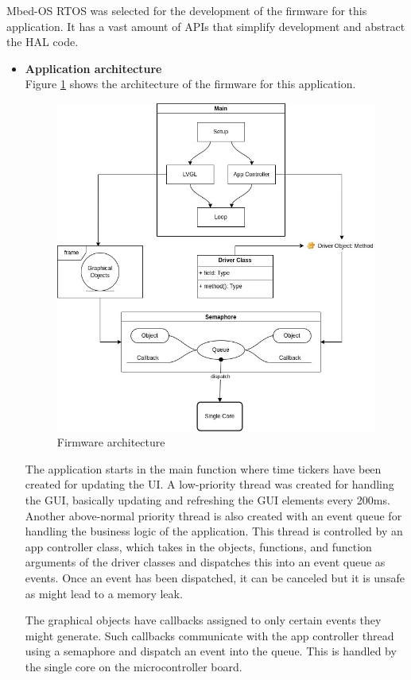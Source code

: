 Mbed-OS RTOS was selected for the development of the firmware for this application. It has a vast amount of APIs that simplify development and abstract the HAL code.
\begin{itemize}
    \item \textbf{Application architecture}\\
    Figure \ref{fig:firmware_architecture} shows the architecture of the firmware for this application.
    \begin{figure}[H]
        \centering
        \includegraphics[width=\textwidth]{Figures/firmwareArchitecture.jpg}
        \caption{Firmware architecture}
        \label{fig:firmware_architecture}
    \end{figure}
    The application starts in the main function where time tickers have been created for updating the UI. A low-priority thread was created for handling the GUI, basically updating and refreshing the GUI elements every 200ms. Another above-normal priority thread is also created with an event queue for handling the business logic of the application. This thread is controlled by an app controller class, which takes in the objects, functions, and function arguments of the driver classes and dispatches this into an event queue as events. Once an event has been dispatched, it can be canceled but it is unsafe as might lead to a memory leak. 
    \par 
    The graphical objects have callbacks assigned to only certain events they might generate. Such callbacks communicate with the app controller thread using a semaphore and dispatch an event into the queue. This is handled by the single core on the microcontroller board.


\end{itemize}
